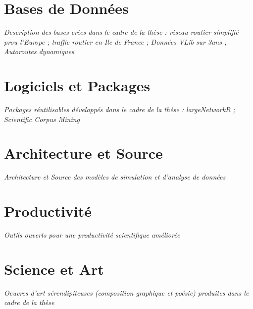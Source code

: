 \section{Bases de Données}


\textit{Description des bases crées dans le cadre de la thèse : réseau routier simplifié prou l'Europe ; traffic routier en Ile de France ; Données VLib sur 3ans ; Autoroutes dynamiques} 


\section{Logiciels et Packages}

\textit{Packages réutilisables développés dans le cadre de la thèse : largeNetworkR ; Scientific Corpus Mining}


\section{Architecture et Source}

\textit{Architecture et Source des modèles de simulation et d'analyse de données}


\section{Productivité}

\textit{Outils ouverts pour une productivité scientifique améliorée}


\section{Science et Art}

\textit{Oeuvres d'art sérendipiteuses (composition graphique et poésie) produites dans le cadre de la thèse}









